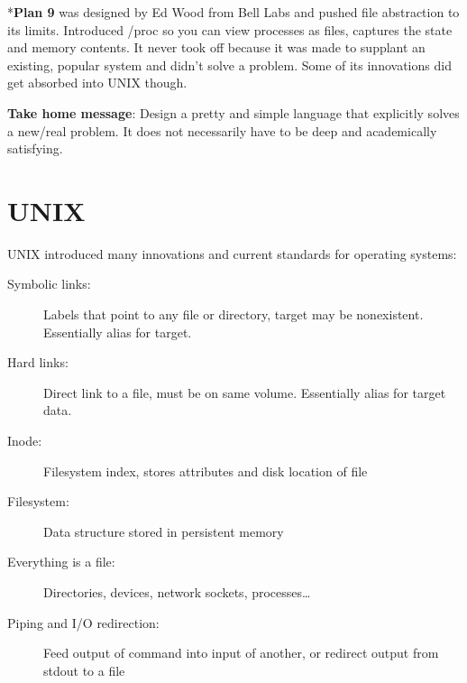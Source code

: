 \documentclass[twoside]{article}
\begin{document}
\begin{footnotesize}
*\textbf{Plan 9} was designed by Ed Wood from Bell Labs and pushed file abstraction to its limits. Introduced /proc so you can view processes as files, captures the state and memory contents. It never took off because it was made to supplant an existing, popular system and didn't solve a problem. Some of its innovations did get absorbed into UNIX though.\\
\end{footnotesize}


\textbf{Take home message}: Design a pretty and simple language that explicitly solves a new/real problem. It does not necessarily have to be deep and academically satisfying. 
\section{UNIX}
UNIX introduced many innovations and current standards for operating systems:
\begin{description}
\item[Symbolic links:] Labels that point to any file or directory, target may be
  nonexistent. Essentially alias for target.
\item[Hard links:] Direct link to a file, must be on same volume. Essentially
  alias for target data.
\item[Inode:] Filesystem index, stores attributes and disk location of file
\item[Filesystem:] Data structure stored in persistent memory
\item[Everything is a file:] Directories, devices, network sockets,
  processes\ldots
\item[Piping and I/O redirection:] Feed output of command into input of another,
  or redirect output from stdout to a file
\end{description}
\end{document}
